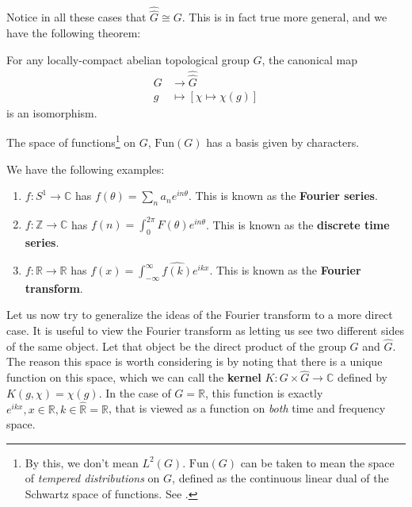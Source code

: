 Notice in all these cases that $\widehat{\widehat G} \cong G$. This is in fact true more general, and we have the following theorem:
\begin{theorem}
For any locally-compact abelian topological group $G$, the canonical map 
\begin{equation*}
\begin{split}
G &\to \widehat{\widehat G}\\
g &\mapsto [\chi \mapsto \chi (g)]
\end{split}
\end{equation*}
is an isomorphism.
\end{theorem}

\begin{obs}
	The space of functions\footnote{By this, we don't mean $L^2(G)$. $\mathrm{Fun}(G)$ can be taken to mean the space of \emph{tempered distributions} on $G$, defined as the continuous linear dual of the Schwartz space of functions. See \cite{arthur1989}.} on $G$, $\mathrm{Fun}(G)$ has a basis given by characters. 
\end{obs}
\begin{eg}
	We have the following examples:
	\begin{enumerate}
		\item $f: S^1 \to \mathbb C$ has $f(\theta) = \sum_{n} a_n e^{i n \theta}$. This is known as the \textbf{Fourier series}.
		\item $f: \mathbb Z \to \mathbb C$ has $f(n) = \int_{0}^{2\pi} F(\theta) e^{i n \theta}$. This is known as the \textbf{discrete time series}.
		\item $f: \mathbb R \to \mathbb R$ has $f(x) = \int_{-\infty}^\infty \widehat{f(k)} e^{ikx}$. This is known as the \textbf{Fourier transform}.
	\end{enumerate}
\end{eg}

Let us now try to generalize the ideas of the Fourier transform to a more direct case. It is useful to view the Fourier transform as letting us see two different sides of the same object. Let that object be the direct product of the group $G$ and $\hat G$. 
The reason this space is worth considering is by noting that there is a unique function on this space, which we can call the \textbf{kernel} $K: G \times \hat G \to \mathbb C$ defined by $K(g, \chi) = \chi (g)$. In the case of  $G=\mathbb R$, this function is exactly $e^{i k x}, x \in \mathbb R, k \in \widehat{ \mathbb R} = \mathbb R$, that is viewed as a function on \emph{both} time and frequency space.

